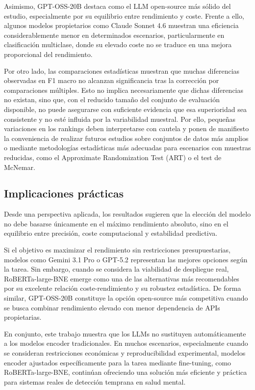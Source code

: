 Asimismo, GPT-OSS-20B destaca como el LLM open-source más sólido del estudio, especialmente por su equilibrio entre rendimiento y coste. Frente a ello, algunos modelos propietarios como Claude Sonnet 4.6 muestran una eficiencia considerablemente menor en determinados escenarios, particularmente en clasificación multiclase, donde su elevado coste no se traduce en una mejora proporcional del rendimiento.

Por otro lado, las comparaciones estadísticas muestran que muchas diferencias observadas en F1 macro no alcanzan significancia tras la corrección por comparaciones múltiples. Esto no implica necesariamente que dichas diferencias no existan, sino que, con el reducido tamaño del conjunto de evaluación disponible, no puede asegurarse con suficiente evidencia que esa superioridad sea consistente y no esté influida por la variabilidad muestral. Por ello, pequeñas variaciones en los rankings deben interpretarse con cautela y ponen de manifiesto la conveniencia de realizar futuros estudios sobre conjuntos de datos más amplios o mediante metodologías estadísticas más adecuadas para escenarios con muestras reducidas, como el Approximate Randomization Test (ART) o el test de McNemar.

\subsection{Implicaciones prácticas}

Desde una perspectiva aplicada, los resultados sugieren que la elección del modelo no debe basarse únicamente en el máximo rendimiento absoluto, sino en el equilibrio entre precisión, coste computacional y estabilidad predictiva.

Si el objetivo es maximizar el rendimiento sin restricciones presupuestarias, modelos como Gemini 3.1 Pro o GPT-5.2 representan las mejores opciones según la tarea. Sin embargo, cuando se considera la viabilidad de despliegue real, RoBERTa-large-BNE emerge como una de las alternativas más recomendables por su excelente relación coste-rendimiento y su robustez estadística. De forma similar, GPT-OSS-20B constituye la opción open-source más competitiva cuando se busca combinar rendimiento elevado con menor dependencia de APIs propietarias.

En conjunto, este trabajo muestra que los LLMs no sustituyen automáticamente a los modelos encoder tradicionales. En muchos escenarios, especialmente cuando se consideran restricciones económicas y reproducibilidad experimental, modelos encoder ajustados específicamente para la tarea mediante fine-tuning, como RoBERTa-large-BNE, continúan ofreciendo una solución más eficiente y práctica para sistemas reales de detección temprana en salud mental.

